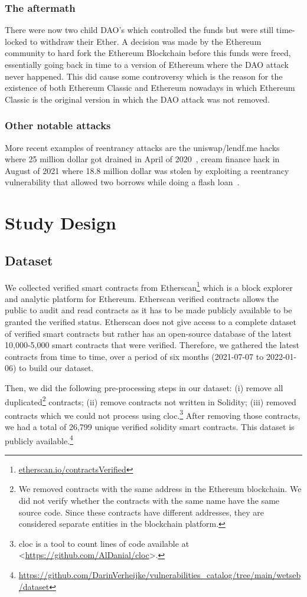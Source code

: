 \documentclass[10pt,conference]{IEEEtran}
\newcommand{\totalContracts}{26,799\xspace}
\begin{document}
\subsubsection{The aftermath}
There were now two child DAO's which controlled the funds but were still time-locked to withdraw their Ether. A decision was made by the Ethereum community to hard fork the Ethereum Blockchain before this funds were freed, essentially going back in time to a version of Ethereum where the DAO attack never happened. This did cause some controversy which is the reason for the existence of both Ethereum Classic and Ethereum nowadays in which Ethereum Classic is the original version in which the DAO attack was not removed.

\subsubsection{Other notable attacks}
More recent examples of reentrancy attacks are the uniswap/lendf.me hacks where 25 million dollar got drained in April of 2020~\cite{lendf}, cream finance hack in August of 2021 where 18.8 million dollar was stolen by exploiting a reentrancy vulnerability that allowed two borrows while doing a flash loan~\cite{cream}.


\section{Study Design}\label{sec:study-design}
\subsection{Dataset}

We collected verified smart contracts from Etherscan\footnote{\url{etherscan.io/contractsVerified}} which is a block explorer and analytic platform for Ethereum. Etherscan verified contracts allows the public to audit and read contracts as it has to be made publicly available to be granted the verified status. Etherscan does not give access to a complete dataset of verified smart contracts but rather has an open-source database of the latest 10,000-5,000 smart contracts that were verified. Therefore, we gathered the latest contracts from time to time, over a period of six months (2021-07-07 to 2022-01-06) to build our dataset.

Then, we did the following pre-processing steps in our dataset: (i) remove all duplicated\footnote{We removed contracts with the same address in the Ethereum blockchain. We did not verify whether the contracts with the same name have the same source code. Since these contracts have different addresses, they are considered separate entities in the blockchain platform.} contracts; (ii) remove contracts not written in Solidity; (iii) removed contracts which we could not process using cloc.\footnote{cloc is a tool to count lines of code available at <\url{https://github.com/AlDanial/cloc}>.} After removing those contracts, we had a total of \totalContracts unique verified solidity smart contracts. This dataset is publicly available.\footnote{\url{https://github.com/DarinVerheijke/vulnerabilities_catalog/tree/main/wetseb/dataset}}
\end{document}
